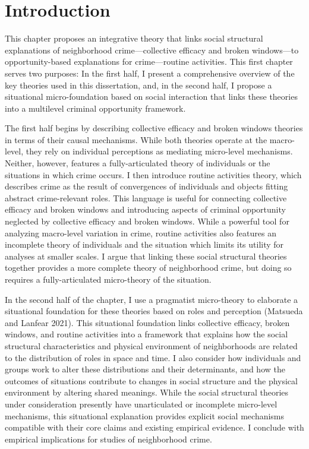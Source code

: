 \documentclass [11pt, proquest] {uwthesis}[2015/03/03]
\begin{document}
\hypertarget{introduction-1}{%
\section{Introduction}\label{introduction-1}}

This chapter proposes an integrative theory that links social structural explanations of neighborhood crime---collective efficacy and broken windows---to opportunity-based explanations for crime---routine activities. This first chapter serves two purposes: In the first half, I present a comprehensive overview of the key theories used in this dissertation, and, in the second half, I propose a situational micro-foundation based on social interaction that links these theories into a multilevel criminal opportunity framework.

The first half begins by describing collective efficacy and broken windows theories in terms of their causal mechanisms. While both theories operate at the macro-level, they rely on individual perceptions as mediating micro-level mechanisms. Neither, however, features a fully-articulated theory of individuals or the situations in which crime occurs. I then introduce routine activities theory, which describes crime as the result of convergences of individuals and objects fitting abstract crime-relevant roles. This language is useful for connecting collective efficacy and broken windows and introducing aspects of criminal opportunity neglected by collective efficacy and broken windows. While a powerful tool for analyzing macro-level variation in crime, routine activities also features an incomplete theory of individuals and the situation which limits its utility for analyses at smaller scales. I argue that linking these social structural theories together provides a more complete theory of neighborhood crime, but doing so requires a fully-articulated micro-theory of the situation.

In the second half of the chapter, I use a pragmatist micro-theory to elaborate a situational foundation for these theories based on roles and perception (Matsueda and Lanfear 2021). This situational foundation links collective efficacy, broken windows, and routine activities into a framework that explains how the social structural characteristics and physical environment of neighborhoods are related to the distribution of roles in space and time. I also consider how individuals and groups work to alter these distributions and their determinants, and how the outcomes of situations contribute to changes in social structure and the physical environment by altering shared meanings. While the social structural theories under consideration presently have unarticulated or incomplete micro-level mechanisms, this situational explanation provides explicit social mechanisms compatible with their core claims and existing empirical evidence. I conclude with empirical implications for studies of neighborhood crime.
\end{document}

